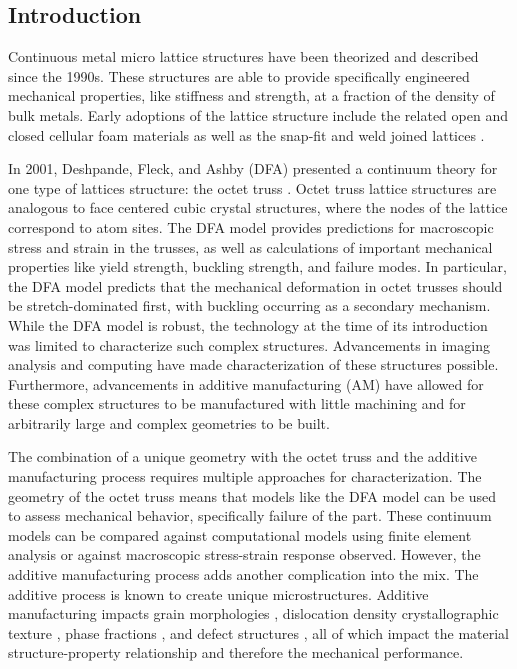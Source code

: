 \subsection{Introduction}
Continuous metal micro lattice structures have been theorized and described since the 1990s. These structures are able to provide specifically engineered mechanical properties, like stiffness and strength, at a fraction of the density of bulk metals. Early adoptions of the lattice structure include the related open and closed cellular foam materials \cite{Bonatti2017} as well as the snap-fit and weld joined lattices \cite{Dong2015}. 

In 2001, Deshpande, Fleck, and Ashby (DFA) presented a continuum theory for one type of lattices structure: the octet truss \cite{Deshpande2001}. Octet truss lattice structures are analogous to face centered cubic crystal structures, where the nodes of the lattice correspond to atom sites. The DFA model provides predictions for macroscopic stress and strain in the trusses, as well as calculations of important mechanical properties like yield strength, buckling strength, and failure modes. In particular, the DFA model predicts that the mechanical deformation in octet trusses should be stretch-dominated first, with buckling occurring as a secondary mechanism. While the DFA model is robust, the technology at the time of its introduction was limited to characterize such complex structures. Advancements in imaging analysis and computing have made characterization of these structures possible. Furthermore, advancements in additive manufacturing (AM) have allowed for these complex structures to be manufactured with little machining and for arbitrarily large and complex geometries to be built.

The combination of a unique geometry with the octet truss and the additive manufacturing process requires multiple approaches for characterization. The geometry of the octet truss means that models like the DFA model can be used to assess mechanical behavior, specifically failure of the part. These continuum models can be compared against computational models using finite element analysis or against macroscopic stress-strain response observed. However, the additive manufacturing process adds another complication into the mix. The additive process is known to create unique microstructures. Additive manufacturing impacts grain morphologies \cite{Tan2015, Zhu2018}, dislocation density \cite{Zhang2015, Wang2017, Gallmeyer2020} crystallographic texture \cite{Wang2019}, phase fractions \cite{Gallmeyer2020}, and defect structures \cite{Yang2017,Matthews2016}, all of which impact the material structure-property relationship and therefore the mechanical performance. 

